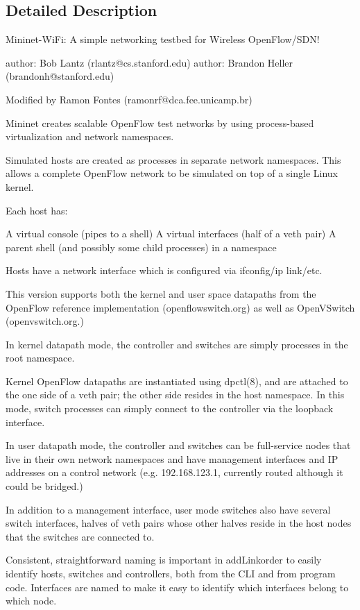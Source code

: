\subsection{Detailed Description}
\begin{DoxyVerb}    Mininet-WiFi: A simple networking testbed for Wireless OpenFlow/SDN!

author: Bob Lantz (rlantz@cs.stanford.edu)
author: Brandon Heller (brandonh@stanford.edu)

Modified by Ramon Fontes (ramonrf@dca.fee.unicamp.br)

Mininet creates scalable OpenFlow test networks by using
process-based virtualization and network namespaces.

Simulated hosts are created as processes in separate network
namespaces. This allows a complete OpenFlow network to be simulated on
top of a single Linux kernel.

Each host has:

A virtual console (pipes to a shell)
A virtual interfaces (half of a veth pair)
A parent shell (and possibly some child processes) in a namespace

Hosts have a network interface which is configured via ifconfig/ip
link/etc.

This version supports both the kernel and user space datapaths
from the OpenFlow reference implementation (openflowswitch.org)
as well as OpenVSwitch (openvswitch.org.)

In kernel datapath mode, the controller and switches are simply
processes in the root namespace.

Kernel OpenFlow datapaths are instantiated using dpctl(8), and are
attached to the one side of a veth pair; the other side resides in the
host namespace. In this mode, switch processes can simply connect to the
controller via the loopback interface.

In user datapath mode, the controller and switches can be full-service
nodes that live in their own network namespaces and have management
interfaces and IP addresses on a control network (e.g. 192.168.123.1,
currently routed although it could be bridged.)

In addition to a management interface, user mode switches also have
several switch interfaces, halves of veth pairs whose other halves
reside in the host nodes that the switches are connected to.

Consistent, straightforward naming is important in addLinkorder to easily
identify hosts, switches and controllers, both from the CLI and
from program code. Interfaces are named to make it easy to identify
which interfaces belong to which node.


\end{DoxyVerb}
